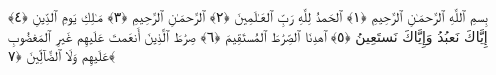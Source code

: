 
  
    
  
    
    

\nopagebreak
 بِسمِ ٱللَّهِ ٱلرَّحمَـٰنِ ٱلرَّحِيمِ ﴿١﴾
 ٱلحَمدُ لِلَّهِ رَبِّ ٱلعَـٰلَمِينَ ﴿٢﴾
 ٱلرَّحمَـٰنِ ٱلرَّحِيمِ ﴿٣﴾
 مَـٰلِكِ يَومِ ٱلدِّينِ ﴿٤﴾
 إِيَّاكَ نَعبُدُ وَإِيَّاكَ نَستَعِينُ ﴿٥﴾
 ٱهدِنَا ٱلصِّرَٰطَ ٱلمُستَقِيمَ ﴿٦﴾
 صِرَٰطَ ٱلَّذِينَ أَنعَمتَ عَلَيهِم غَيرِ ٱلمَغضُوبِ عَلَيهِم وَلَا ٱلضَّآلِّينَ ﴿٧﴾
 

